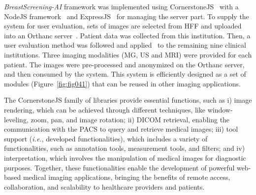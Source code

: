 {\it BreastScreening-AI} framework was implemented using CornerstoneJS\footnotemark[18]~\cite{urban2017lesiontracker} with a NodeJS framework\footnotemark[19]~\cite{drnasin2017javascript} and ExpressJS\footnotemark[20]~\cite{gustin2017empowerment} for managing the server part.
To supply the system for user evaluation, sets of images are selected from \ac{HFF} and uploaded into an Orthanc server~\cite{Jodogne2018}.
Patient data was collected from this institution.
Then, a user evaluation method was followed and applied~\cite{CALISTO2021102607} to the remaining nine clinical institutions.
Three imaging modalities (\ac{MG}, \ac{US} and \ac{MRI}) were provided for each patient.
The images were pre-processed and anonymized on the Orthanc server, and then consumed by the system.
This system is efficiently designed as a set of modules (Figure~\ref{fig:fig041}) that can be reused in other imaging applications.




The CornerstoneJS family of libraries provide essential functions, such as
i) image rendering, which can be achieved through different techniques, like window-leveling, zoom, pan, and image rotation;
ii) \ac{DICOM} retrieval, enabling the communication with the \ac{PACS} to query and retrieve medical images;
iii) tool support ({\it i.e.}, developed functionalities), which includes a variety of functionalities, such as annotation tools, measurement tools, and filters; and
iv) interpretation, which involves the manipulation of medical images for diagnostic purposes.
Together, these functionalities enable the development of powerful web-based medical imaging applications, bringing the benefits of remote access, collaboration, and scalability to healthcare providers and patients.

